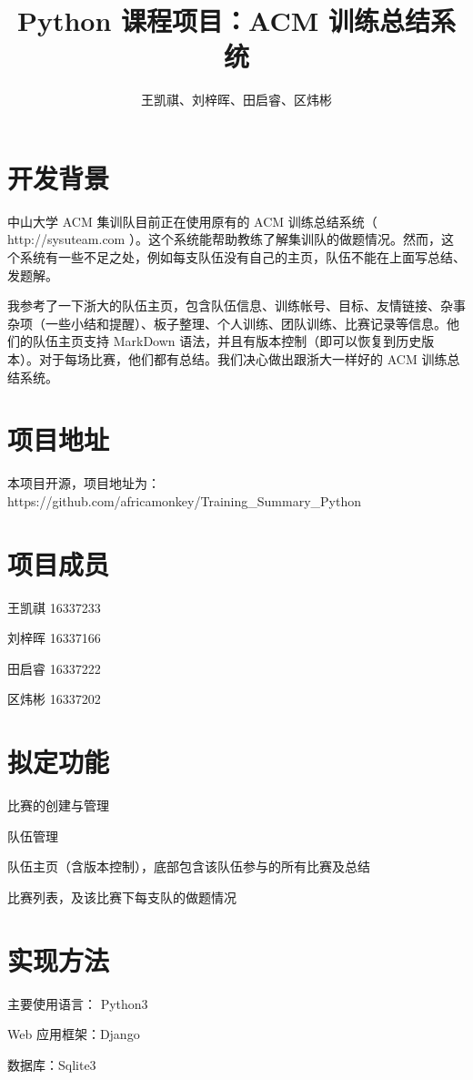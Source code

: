 \documentclass{article}
\begin{document}
\title{Python 课程项目：ACM 训练总结系统}
\author{王凯祺、刘梓晖、田启睿、区炜彬}
\maketitle

\section{开发背景}

中山大学 ACM 集训队目前正在使用原有的 ACM 训练总结系统（ http://sysuteam.com ）。这个系统能帮助教练了解集训队的做题情况。然而，这个系统有一些不足之处，例如每支队伍没有自己的主页，队伍不能在上面写总结、发题解。

我参考了一下浙大的队伍主页，包含队伍信息、训练帐号、目标、友情链接、杂事杂项（一些小结和提醒）、板子整理、个人训练、团队训练、比赛记录等信息。他们的队伍主页支持 MarkDown 语法，并且有版本控制（即可以恢复到历史版本）。对于每场比赛，他们都有总结。我们决心做出跟浙大一样好的 ACM 训练总结系统。

\section{项目地址}

本项目开源，项目地址为： https://github.com/africamonkey/Training\_Summary\_Python

\section{项目成员}

王凯祺 16337233

刘梓晖 16337166

田启睿 16337222

区炜彬 16337202

\section{拟定功能}

比赛的创建与管理

队伍管理

队伍主页（含版本控制），底部包含该队伍参与的所有比赛及总结

比赛列表，及该比赛下每支队的做题情况

\section{实现方法}

主要使用语言： Python3

Web 应用框架：Django

数据库：Sqlite3
\end{document}
